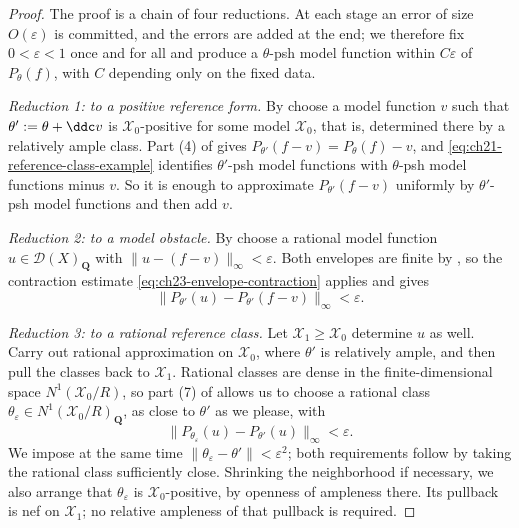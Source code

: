 \begin{proof}
The proof is a chain of four reductions.  At each stage an error of size
$O(\varepsilon)$ is committed, and the errors are added at the end; we
therefore fix $0<\varepsilon<1$ once and for all and produce a
$\theta$-psh model function within $C\varepsilon$ of $P_\theta(f)$,
with $C$ depending only on the fixed data.

\emph{Reduction 1: to a positive reference form.}
By  choose a model function $v$
such that $\theta':=\theta+\ddc v$ is $\mathcal X_0$-positive for some
model $\mathcal X_0$, that is, determined there by a relatively ample
class.  Part (4) of  gives
$P_{\theta'}(f-v)=P_\theta(f)-v$, and
\eqref{eq:ch21-reference-class-example} identifies $\theta'$-psh model
functions with $\theta$-psh model functions minus $v$.  So it is enough
to approximate $P_{\theta'}(f-v)$ uniformly by $\theta'$-psh model
functions and then add $v$.

\emph{Reduction 2: to a model obstacle.}
By  choose a rational model function
$u\in\mathcal D(X)_{\mathbf Q}$ with
$\|u-(f-v)\|_\infty<\varepsilon$.  Both envelopes are finite by
, so the contraction estimate
\eqref{eq:ch23-envelope-contraction} applies and gives
\begin{equation}\label{eq:ch23-obstacle-reduction}
       \|P_{\theta'}(u)-P_{\theta'}(f-v)\|_\infty<\varepsilon.
\end{equation}

\emph{Reduction 3: to a rational reference class.}
Let $\mathcal X_1\geq\mathcal X_0$ determine $u$ as well.  Carry out
rational approximation on $\mathcal X_0$, where $\theta'$ is relatively
ample, and then pull the classes back to $\mathcal X_1$.  Rational classes
are dense in the finite-dimensional space $N^1(\mathcal X_0/R)$, so part (7) of
 allows us to choose a rational
class $\theta_\varepsilon\in N^1(\mathcal X_0/R)_{\mathbf Q}$, as close to
$\theta'$ as we please, with
\begin{equation}\label{eq:ch23-class-reduction}
 \|P_{\theta_\varepsilon}(u)-P_{\theta'}(u)\|_\infty<\varepsilon .
\end{equation}
We impose at the same time
$\|\theta_\varepsilon-\theta'\|<\varepsilon^2$; both requirements follow
by taking the rational class sufficiently close.  Shrinking the
neighborhood if necessary, we also arrange that $\theta_\varepsilon$ is
$\mathcal X_0$-positive, by openness of ampleness there.  Its pullback
is nef on $\mathcal X_1$; no relative ampleness of that pullback is
required.


\end{proof}
